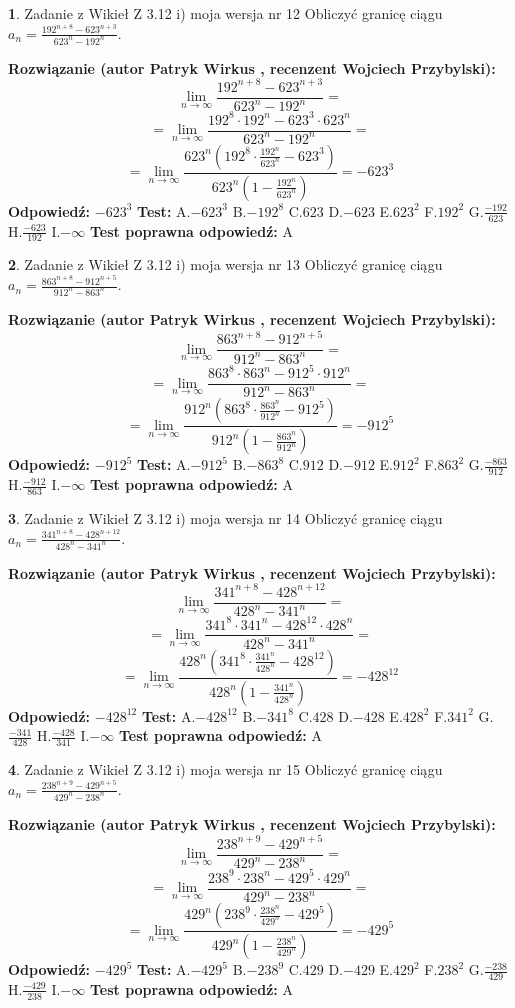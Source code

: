 \documentclass[12pt, a4paper]{article}
\theoremstyle{definition} %
\newtheorem{zad}{}
\newcommand{\zadStart}[1]{\begin{zad}#1\newline}
\newcommand{\zadStop}{\end{zad}}
\newcommand{\rozwStart}[2]{\noindent \textbf{Rozwiązanie (autor #1 , recenzent #2): }\newline}
\newcommand{\rozwStop}{\newline}
\newcommand{\odpStart}{\noindent \textbf{Odpowiedź:}\newline}
\newcommand{\odpStop}{\newline}
\newcommand{\testStart}{\noindent \textbf{Test:}\newline}
\newcommand{\testStop}{\newline}
\newcommand{\kluczStart}{\noindent \textbf{Test poprawna odpowiedź:}\newline}
\newcommand{\kluczStop}{\newline}
\begin{document}
\zadStart{Zadanie z Wikieł Z 3.12 i) moja wersja nr 12}
Obliczyć granicę ciągu $a_{n}=\frac{192^{n+8} - 623^{n+3}}{623^{n}-192^{n}}$.
\zadStop
\rozwStart{Patryk Wirkus}{Wojciech Przybylski}
$$\lim\limits_{n\to\infty}\frac{192^{n+8} - 623^{n+3}}{623^{n}-192^{n}}=$$
$$= \lim\limits_{n\to\infty}\frac{192^{8} \cdot 192^{n} - 623^{3} \cdot 623^{n}}{623^{n}-192^{n}}=$$
$$= \lim\limits_{n\to\infty}\frac{623^{n}(192^{8} \cdot \frac{192^{n}}{623^{n}} - 623^{3})}{623^{n}(1-\frac{192^{n}}{623^{n}})} = -623^{3}$$
\rozwStop
\odpStart
$-623^{3}$
\odpStop
\testStart
A.$-623^{3}$
B.$-192^{8}$
C.$623$
D.$-623$
E.$623^{2}$
F.$192^{2}$
G.$\frac{-192}{623}$
H.$\frac{-623}{192}$
I.$-\infty$
\testStop
\kluczStart
A
\kluczStop



\zadStart{Zadanie z Wikieł Z 3.12 i) moja wersja nr 13}
Obliczyć granicę ciągu $a_{n}=\frac{863^{n+8} - 912^{n+5}}{912^{n}-863^{n}}$.
\zadStop
\rozwStart{Patryk Wirkus}{Wojciech Przybylski}
$$\lim\limits_{n\to\infty}\frac{863^{n+8} - 912^{n+5}}{912^{n}-863^{n}}=$$
$$= \lim\limits_{n\to\infty}\frac{863^{8} \cdot 863^{n} - 912^{5} \cdot 912^{n}}{912^{n}-863^{n}}=$$
$$= \lim\limits_{n\to\infty}\frac{912^{n}(863^{8} \cdot \frac{863^{n}}{912^{n}} - 912^{5})}{912^{n}(1-\frac{863^{n}}{912^{n}})} = -912^{5}$$
\rozwStop
\odpStart
$-912^{5}$
\odpStop
\testStart
A.$-912^{5}$
B.$-863^{8}$
C.$912$
D.$-912$
E.$912^{2}$
F.$863^{2}$
G.$\frac{-863}{912}$
H.$\frac{-912}{863}$
I.$-\infty$
\testStop
\kluczStart
A
\kluczStop



\zadStart{Zadanie z Wikieł Z 3.12 i) moja wersja nr 14}
Obliczyć granicę ciągu $a_{n}=\frac{341^{n+8} - 428^{n+12}}{428^{n}-341^{n}}$.
\zadStop
\rozwStart{Patryk Wirkus}{Wojciech Przybylski}
$$\lim\limits_{n\to\infty}\frac{341^{n+8} - 428^{n+12}}{428^{n}-341^{n}}=$$
$$= \lim\limits_{n\to\infty}\frac{341^{8} \cdot 341^{n} - 428^{12} \cdot 428^{n}}{428^{n}-341^{n}}=$$
$$= \lim\limits_{n\to\infty}\frac{428^{n}(341^{8} \cdot \frac{341^{n}}{428^{n}} - 428^{12})}{428^{n}(1-\frac{341^{n}}{428^{n}})} = -428^{12}$$
\rozwStop
\odpStart
$-428^{12}$
\odpStop
\testStart
A.$-428^{12}$
B.$-341^{8}$
C.$428$
D.$-428$
E.$428^{2}$
F.$341^{2}$
G.$\frac{-341}{428}$
H.$\frac{-428}{341}$
I.$-\infty$
\testStop
\kluczStart
A
\kluczStop



\zadStart{Zadanie z Wikieł Z 3.12 i) moja wersja nr 15}
Obliczyć granicę ciągu $a_{n}=\frac{238^{n+9} - 429^{n+5}}{429^{n}-238^{n}}$.
\zadStop
\rozwStart{Patryk Wirkus}{Wojciech Przybylski}
$$\lim\limits_{n\to\infty}\frac{238^{n+9} - 429^{n+5}}{429^{n}-238^{n}}=$$
$$= \lim\limits_{n\to\infty}\frac{238^{9} \cdot 238^{n} - 429^{5} \cdot 429^{n}}{429^{n}-238^{n}}=$$
$$= \lim\limits_{n\to\infty}\frac{429^{n}(238^{9} \cdot \frac{238^{n}}{429^{n}} - 429^{5})}{429^{n}(1-\frac{238^{n}}{429^{n}})} = -429^{5}$$
\rozwStop
\odpStart
$-429^{5}$
\odpStop
\testStart
A.$-429^{5}$
B.$-238^{9}$
C.$429$
D.$-429$
E.$429^{2}$
F.$238^{2}$
G.$\frac{-238}{429}$
H.$\frac{-429}{238}$
I.$-\infty$
\testStop
\kluczStart
A
\kluczStop
\end{document}
